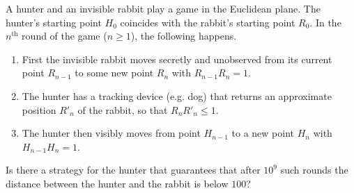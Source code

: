 A hunter and an invisible rabbit play a game in the Euclidean plane. The hunter's starting point $H_0$ coincides with the rabbit's starting point $R_0$. In the $n^{\text{th}}$ round of the game ($n \geq 1$), the following happens.
\begin{enumerate}
\item[(1)] First the invisible rabbit moves secretly and unobserved from its current point $R_{n-1}$ to some new point $R_n$ with $R_{n-1}R_n = 1$.
\item[(2)] The hunter has a tracking device (e.g. dog) that returns an approximate position $R'_n$ of the rabbit, so that $R_n R'_n \leq 1$.
\item[(3)] The hunter then visibly moves from point $H_{n-1}$ to a new point $H_n$ with $H_{n-1}H_n = 1$.
\end{enumerate}
Is there a strategy for the hunter that guarantees that after $10^9$ such rounds the distance between the hunter and the rabbit is below $100$?
